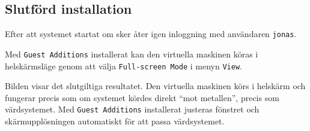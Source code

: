            {}
           {}

           {}
           {}

           {}
           {}

           {}
           {}

           {}
           {}

           {}
           {}

           {}
           {}

           {}
           {}

           {}
           {}

           {}
           {}


\subsection{Slutförd installation}

           {Efter att systemet startat om sker åter igen inloggning med
            användaren \texttt{jonas}.}
           {}

           {Med \texttt{Guest Additions} installerat kan den virtuella maskinen
            köras i helskärmsläge genom att välja \texttt{Full-screen Mode} i 
            menyn \texttt{View}.}
           {}

           {Bilden visar det slutgiltiga resultatet. Den virtuella maskinen
            körs i helskärm och fungerar precis som om systemet kördes direkt
            ``mot metallen'', precis som värdsystemet. 
            Med \texttt{Guest Additions} installerat justeras fönstret och 
            skärmupplösningen automatiskt för att passa värdsystemet.}
           {}

